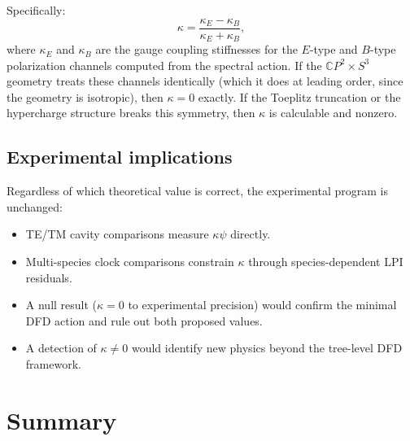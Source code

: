 \documentclass[11pt,a4paper]{article}
\begin{document}
Specifically:
\begin{equation}
\kappa = \frac{\kappa_{E} - \kappa_{B}}{\kappa_{E} + \kappa_{B}},
\end{equation}
where $\kappa_{E}$ and $\kappa_{B}$ are the gauge coupling stiffnesses
for the $E$-type and $B$-type polarization channels computed from the
spectral action.  If the $\mathbb{C}P^2 \times S^3$ geometry treats
these channels identically (which it does at leading order, since the
geometry is isotropic), then $\kappa = 0$ exactly.  If the Toeplitz
truncation or the hypercharge structure breaks this symmetry, then
$\kappa$ is calculable and nonzero.

\subsection{Experimental implications}

Regardless of which theoretical value is correct, the experimental
program is unchanged:
\begin{itemize}
\item TE/TM cavity comparisons measure $\kappa\psi$ directly.
\item Multi-species clock comparisons constrain $\kappa$ through
  species-dependent LPI residuals.
\item A null result ($\kappa = 0$ to experimental precision) would confirm
  the minimal DFD action and rule out both proposed values.
\item A detection of $\kappa \neq 0$ would identify new physics beyond
  the tree-level DFD framework.
\end{itemize}

\section{Summary}
\label{sec:summary}
\end{document}
